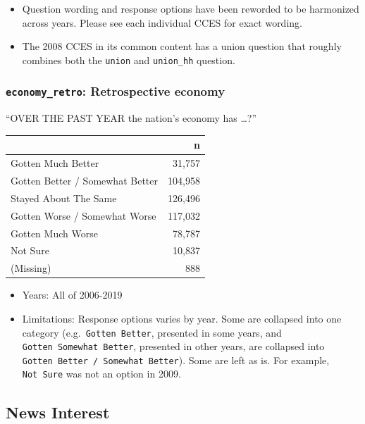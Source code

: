 \documentclass[10pt,article,oneside]{memoir}
\theoremstyle{definition}
\begin{document}
\begin{itemize}
\tightlist
\item
  Question wording and response options have been reworded to be
  harmonized across years. Please see each individual CCES for exact
  wording.
\item
  The 2008 CCES in its common content has a union question that roughly
  combines both the \texttt{union} and \texttt{union\_hh} question.
\end{itemize}

\hypertarget{economy_retro-retrospective-economy}{%
\subsubsection{\texorpdfstring{\texttt{economy\_retro}: Retrospective
economy}{economy\_retro: Retrospective economy}}\label{economy_retro-retrospective-economy}}

``OVER THE PAST YEAR the nation's economy has \ldots?''

\begin{table}[H]
\centering
\begin{tabular}{lr}
\toprule
 & n\\
\midrule
Gotten Much Better & 31,757\\
Gotten Better / Somewhat Better & 104,958\\
Stayed About The Same & 126,496\\
Gotten Worse / Somewhat Worse & 117,032\\
Gotten Much Worse & 78,787\\
Not Sure & 10,837\\
(Missing) & 888\\
\bottomrule
\end{tabular}
\end{table}

\begin{itemize}
\tightlist
\item
  Years: All of 2006-2019
\item
  Limitations: Response options varies by year. Some are collapsed into
  one category (e.g.~\texttt{Gotten\ Better}, presented in some years,
  and \texttt{Gotten\ Somewhat\ Better}, presented in other years, are
  collapsed into \texttt{Gotten\ Better\ /\ Somewhat\ Better}). Some are
  left as is. For example, \texttt{Not\ Sure} was not an option in 2009.
\end{itemize}

\hypertarget{news-interest}{%
\subsection{News Interest}\label{news-interest}}
\end{document}
